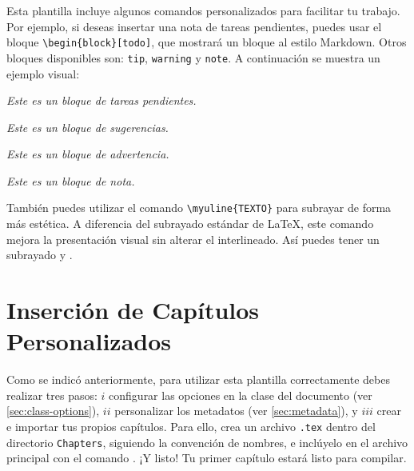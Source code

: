 Esta plantilla incluye algunos comandos personalizados para facilitar tu trabajo. Por ejemplo, si deseas insertar una nota de tareas pendientes, puedes usar el bloque \verb|\begin{block}[todo]|, que mostrará un bloque al estilo Markdown. Otros bloques disponibles son: \verb|tip|, \verb|warning| y \verb|note|. A continuación se muestra un ejemplo visual:

\vspace{.875em}
\begin{tcbraster}[
    raster columns=2, 
    raster equal height, 
    nobeforeafter, 
    raster column skip=2cm
]
\begin{block}[todo]
    \textit{Este es un bloque de tareas pendientes.}
\end{block}
\begin{block}[tip]
    \textit{Este es un bloque de sugerencias.}
\end{block}
\end{tcbraster}

\begin{tcbraster}[
    raster columns=2, 
    raster equal height, 
    nobeforeafter, 
    raster column skip=2cm
]
\begin{block}[warning]
    \textit{Este es un bloque de advertencia.}
\end{block}
\begin{block}[note]
    \textit{Este es un bloque de nota.}
\end{block}
\end{tcbraster}
\vspace{.875em}

También puedes utilizar el comando \verb|\myuline{TEXTO}| para subrayar de forma más estética. A diferencia del subrayado estándar de \LaTeX, este comando mejora la presentación visual sin alterar el interlineado. Así puedes tener un subrayado  y .

\section{Inserción de Capítulos Personalizados}

Como se indicó anteriormente, para utilizar esta plantilla correctamente debes realizar tres pasos: \(i\) configurar las opciones en la clase del documento (ver \autoref{sec:class-options}), \(ii\) personalizar los metadatos (ver \autoref{sec:metadata}), y \(iii\) crear e importar tus propios capítulos. Para ello, crea un archivo \texttt{.tex} dentro del directorio \texttt{Chapters}, siguiendo la convención de nombres, e inclúyelo en el archivo principal con el comando \verb||. ¡Y listo! Tu primer capítulo estará listo para compilar.
